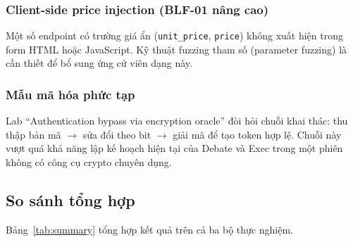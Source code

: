 \subsubsection{Client-side price injection (BLF-01 nâng cao)}

Một số endpoint có trường giá ẩn (\texttt{unit\_price}, \texttt{price}) không xuất hiện trong form HTML hoặc JavaScript. Kỹ thuật fuzzing tham số (parameter fuzzing) là cần thiết để bổ sung ứng cử viên dạng này.

\subsubsection{Mẫu mã hóa phức tạp}

Lab ``Authentication bypass via encryption oracle'' đòi hỏi chuỗi khai thác: thu thập bản mã $\to$ sửa đổi theo bit $\to$ giải mã để tạo token hợp lệ. Chuỗi này vượt quá khả năng lập kế hoạch hiện tại của Debate và Exec trong một phiên không có công cụ crypto chuyên dụng.

\subsection{So sánh tổng hợp}

Bảng~\ref{tab:summary} tổng hợp kết quả trên cả ba bộ thực nghiệm.

